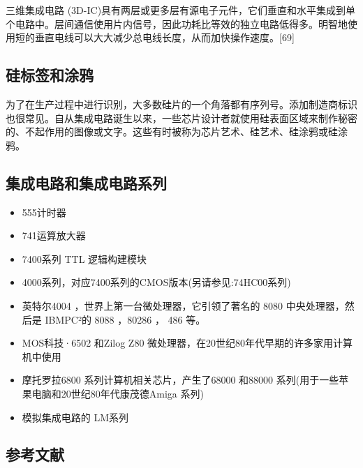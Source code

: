 三维集成电路 (3D-IC)具有两层或更多层有源电子元件，它们垂直和水平集成到单个电路中。层间通信使用片内信号，因此功耗比等效的独立电路低得多。明智地使用短的垂直电线可以大大减少总电线长度，从而加快操作速度。[69]

\subsection{硅标签和涂鸦}

为了在生产过程中进行识别，大多数硅片的一个角落都有序列号。添加制造商标识也很常见。自从集成电路诞生以来，一些芯片设计者就使用硅表面区域来制作秘密的、不起作用的图像或文字。这些有时被称为芯片艺术、硅艺术、硅涂鸦或硅涂鸦。

\subsection{集成电路和集成电路系列}

\begin{itemize}
\item 555计时器
\item 741运算放大器
\item 7400系列 TTL 逻辑构建模块
\item 4000系列，对应7400系列的CMOS版本(另请参见:74HC00系列)
\item 英特尔4004 ，世界上第一台微处理器，它引领了著名的 8080 中央处理器，然后是 IBMPC²的 8088 ，80286 ， 486 等。
\item MOS科技·6502 和Zilog Z80 微处理器，在20世纪80年代早期的许多家用计算机中使用
\item 摩托罗拉6800 系列计算机相关芯片，产生了68000 和88000 系列(用于一些苹果电脑和20世纪80年代康茂德Amiga 系列)
\item 模拟集成电路的 LM系列
\end{itemize}

\subsection{参考文献}

